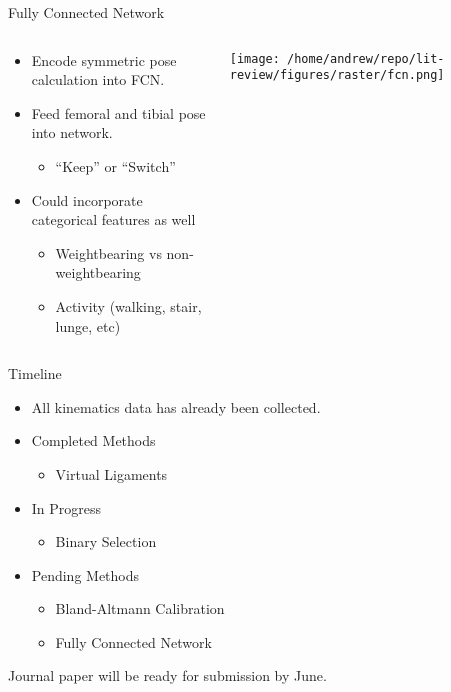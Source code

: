 \documentclass[presentation, aspectratio=1610]{beamer}
\begin{document}
\begin{frame}[label={sec:orged16a4f}]{Fully Connected Network}
\begin{columns}
\begin{column}{0.5\columnwidth}
\begin{itemize}
\item Encode symmetric pose calculation into FCN.
\item Feed femoral and tibial \alert{\alert{pose}} into network.
\begin{itemize}
\item ``Keep'' or ``Switch''
\end{itemize}
\item Could incorporate categorical features as well
\begin{itemize}
\item Weightbearing vs non-weightbearing
\item Activity (walking, stair, lunge, etc)
\end{itemize}
\end{itemize}
\end{column}

\begin{column}{0.6\columnwidth}
\begin{center}
\texttt{[image: /home/andrew/repo/lit-review/figures/raster/fcn.png]}
\end{center}
\end{column}
\end{columns}
\end{frame}

\begin{frame}[label={sec:org071043f}]{Timeline}
\begin{itemize}
\item All kinematics data has already been collected.
\item Completed Methods
\begin{itemize}
\item Virtual Ligaments
\end{itemize}
\item In Progress
\begin{itemize}
\item Binary Selection
\end{itemize}
\item Pending Methods
\begin{itemize}
\item Bland-Altmann Calibration
\item Fully Connected Network
\end{itemize}
\end{itemize}

Journal paper will be ready for submission by June.
\end{frame}
\end{document}
